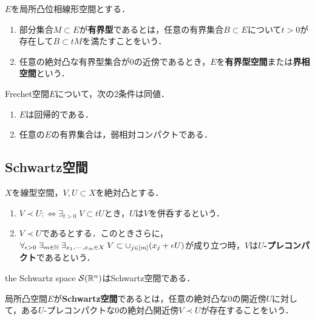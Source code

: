 \documentclass[uplatex,dvipdfmx]{jsreport}
\begin{document}
\begin{definition}
    $E$を局所凸位相線形空間とする．
    \begin{enumerate}
        \item 部分集合$M\subset E$が\textbf{有界型}であるとは，任意の有界集合$B\subset E$について$t>0$が存在して$B\subset tM$を満たすことをいう．
        \item 任意の絶対凸な有界型集合が$0$の近傍であるとき，$E$を\textbf{有界型空間}または\textbf{界相空間}という．
    \end{enumerate}
\end{definition}

\begin{theorem}
    Frechet空間$E$について，次の2条件は同値．
    \begin{enumerate}
        \item $E$は回帰的である．
        \item 任意の$E$の有界集合は，弱相対コンパクトである．
    \end{enumerate}
\end{theorem}

\subsection{Schwartz空間}

\begin{definition}[precompact]
    $X$を線型空間，$V,U\subset X$を絶対凸とする．
    \begin{enumerate}
        \item $V\prec U:\Leftrightarrow\exists_{t>0}\;V\subset tU$とき，$U$は$V$を併呑するという．
        \item $V\prec U$であるとする．このときさらに，$\forall_{\epsilon>0}\;\exists_{m\in\mathbb{N}}\;\exists_{x_1,\cdots,x_m\in X}\;V\subset\cup_{j\in[m]}(x_j+\epsilon U)$が成り立つ時，$V$は\textbf{$U$-プレコンパクト}であるという．
    \end{enumerate}
\end{definition}

\begin{example}
    the Schwartz space $\mathcal{S}(\mathbb{R}^n)$はSchwartz空間である．
\end{example}

\begin{definition}
    局所凸空間$E$が\textbf{Schwartz空間}であるとは，任意の絶対凸な$0$の開近傍$U$に対して，ある$U$-プレコンパクトな$0$の絶対凸開近傍$V\prec U$が存在することをいう．
\end{definition}
\end{document}
